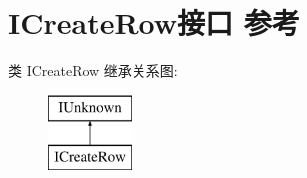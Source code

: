 \hypertarget{interface_i_create_row}{}\section{I\+Create\+Row接口 参考}
\label{interface_i_create_row}
类 I\+Create\+Row 继承关系图\+:\begin{figure}[H]
\begin{center}
\leavevmode
\includegraphics[height=2.000000cm]{interface_i_create_row}
\end{center}
\end{figure}

